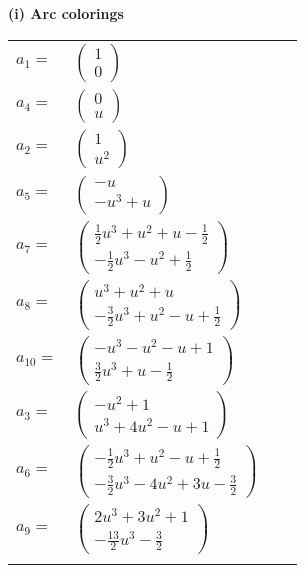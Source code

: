\documentclass[1p]{elsarticle_modified}
\theoremstyle{definition}
\begin{document}
\flushleft \textbf{(i) Arc colorings}\\
\begin{tabular}{m{7pt} m{180pt} m{7pt} m{180pt} }
\flushright $a_{1}=$&$\begin{pmatrix}1\\0\end{pmatrix}$ \\
\flushright $a_{4}=$&$\begin{pmatrix}0\\u\end{pmatrix}$ \\
\flushright $a_{2}=$&$\begin{pmatrix}1\\u^2\end{pmatrix}$ \\
\flushright $a_{5}=$&$\begin{pmatrix}- u\\- u^3+u\end{pmatrix}$ \\
\flushright $a_{7}=$&$\begin{pmatrix}\frac{1}{2} u^3+u^2+u-\frac{1}{2}\\-\frac{1}{2} u^3- u^2+\frac{1}{2}\end{pmatrix}$ \\
\flushright $a_{8}=$&$\begin{pmatrix}u^3+u^2+u\\-\frac{3}{2} u^3+u^2- u+\frac{1}{2}\end{pmatrix}$ \\
\flushright $a_{10}=$&$\begin{pmatrix}- u^3- u^2- u+1\\\frac{3}{2} u^3+u-\frac{1}{2}\end{pmatrix}$ \\
\flushright $a_{3}=$&$\begin{pmatrix}- u^2+1\\u^3+4 u^2- u+1\end{pmatrix}$ \\
\flushright $a_{6}=$&$\begin{pmatrix}-\frac{1}{2} u^3+u^2- u+\frac{1}{2}\\-\frac{3}{2} u^3-4 u^2+3 u-\frac{3}{2}\end{pmatrix}$ \\
\flushright $a_{9}=$&$\begin{pmatrix}2 u^3+3 u^2+1\\-\frac{13}{2} u^3-\frac{3}{2}\end{pmatrix}$\\&\end{tabular}
\end{document}

